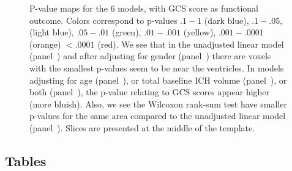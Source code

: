 \documentclass[10pt]{article}\usepackage[]{graphicx}\usepackage[]{color}
\begin{document}
\begin{figure}[H]
{ }
  \hfill
  
  \caption{P-value maps for the $6$ models, with GCS score as functional outcome. Colors correspond to p-values $.1-1$ (dark blue), $.1-.05$, (light blue), $.05-.01$ (green), $.01-.001$ (yellow),  $.001-.0001$ (orange) $< .0001$ (red).  We see that in the unadjusted linear model (panel~\protect{}) and after adjusting for gender (panel~\protect{}) there are voxels with the smallest p-values seem to be near the ventricles.  In models adjusting for age (panel~\protect{}), or total baseline ICH volume (panel~\protect{}), or both (panel~\protect{}), the p-value relating to GCS scores appear higher (more bluish).  Also, we see the Wilcoxon rank-sum test have smaller p-values for the same area compared to the unadjusted linear model (panel~\protect{}). Slices are presented at the middle of the template.  }
  \label{f:gcsmods}
\end{figure}

\subsection{Tables}

\end{document}
